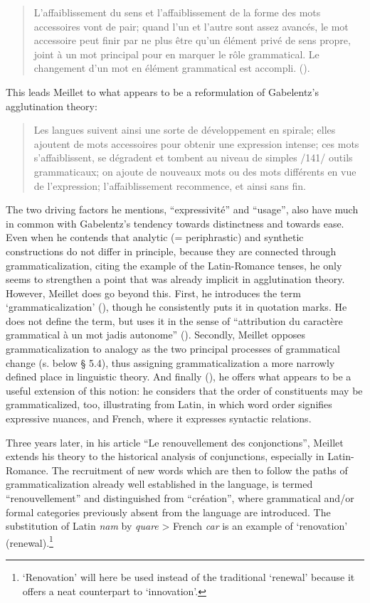 \begin{quote}
L'affaiblissement du sens et l'affaiblissement de la forme des mots accessoires vont de pair; quand l'un et l'autre sont assez avancés, le mot accessoire peut finir par ne plus être qu'un élément privé de sens propre, joint à un mot principal pour en marquer le rôle grammatical. Le changement d'un mot en élément grammatical est accompli. (\citeyear[139]{Meillet1912}). \label{meillet}
\end{quote}

This leads Meillet to what appears to be a reformulation of Gabelentz's agglutination theory:

\begin{quote}
Les langues suivent ainsi une sorte de développement en spirale; elles ajoutent de mots accessoires pour obtenir une expression intense; ces mots s'affaiblissent, se dégradent et tombent au niveau de simples /141/ outils grammaticaux; on ajoute de nouveaux mots ou des mots différents en vue de l'expression; l'affaiblissement recommence, et ainsi sans fin.
\end{quote}

The two driving factors he mentions, “expressivité” and “usage”, also have much in common with Gabelentz's tendency towards distinctness and towards ease. Even when he contends that analytic (= periphrastic) and synthetic constructions do not differ in principle, because they are connected through grammaticalization, citing the example of the Latin-Romance tenses, he only seems to strengthen a point that was already implicit in agglutination theory. However, Meillet does go beyond this. First, he introduces the term ‘grammaticalization’ (\citeyear[133]{Meillet1912}), though he consistently puts it in quotation marks. He does not define the term, but uses it in the sense of “attribution du caractère grammatical à un mot jadis autonome” (\citeyear[131]{Meillet1912}). Secondly, Meillet opposes grammaticalization to analogy as the two principal processes of grammatical change (s. below § 5.4), thus assigning grammaticalization a more narrowly defined place in linguistic theory. And finally (\citeyear[147f]{Meillet1912}), he offers what appears to be a useful extension of this notion: he considers that the order of constituents may be grammaticalized, too, illustrating from Latin, in which word order signifies expressive nuances, and French, where it expresses syntactic relations.

Three years later, in his article “Le renouvellement des conjonctions”, Meillet extends his theory to the historical analysis of conjunctions, especially in Latin-Romance. The recruitment of new words which are then to follow the paths of grammaticalization already well established in the language, is termed “renouvellement” and distinguished from “création”, where grammatical and/or formal categories previously absent from the language are introduced. The substitution of Latin \textit{nam} by \textit{quare} {\textgreater} French \textit{car} is an example of ‘renovation’ (renewal).\footnote{‘Renovation’ will here be used instead of the traditional ‘renewal’ because it offers a neat counterpart to ‘innovation’.}

